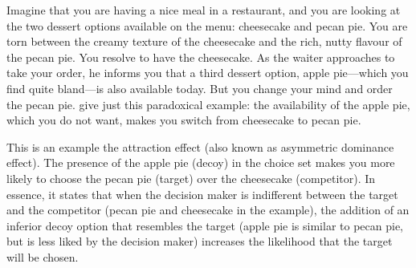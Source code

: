 \documentclass[12pt, a4paper]{article}
\newcommand{\AT}[1] {{\textcolor{cyan}{#1}}}
\begin{document}
Imagine that you are having a nice meal in a restaurant, and you are looking at the two dessert options available on the menu: cheesecake and pecan pie. You are torn between the creamy texture of the cheesecake and the rich, nutty flavour of the pecan pie. You resolve to have the cheesecake. As the waiter approaches to take your order, he informs you that a third dessert option, apple pie---which you find quite bland---is also available today. But you change your mind and order the pecan pie.  give just this paradoxical example: the availability of the apple pie, which you do not want, makes you switch from cheesecake to pecan pie.

This is an example the attraction effect (also known as asymmetric dominance effect). The presence of the apple pie (decoy) in the choice set makes you more likely to choose the pecan pie (target) over the cheesecake (competitor). In essence, it states that when the decision maker is indifferent between the target and the competitor (pecan pie and cheesecake in the example), the addition of an inferior decoy option that resembles the target (apple pie is similar to pecan pie, but is less liked by the decision maker) increases the likelihood that the target will be chosen.



\end{document}
